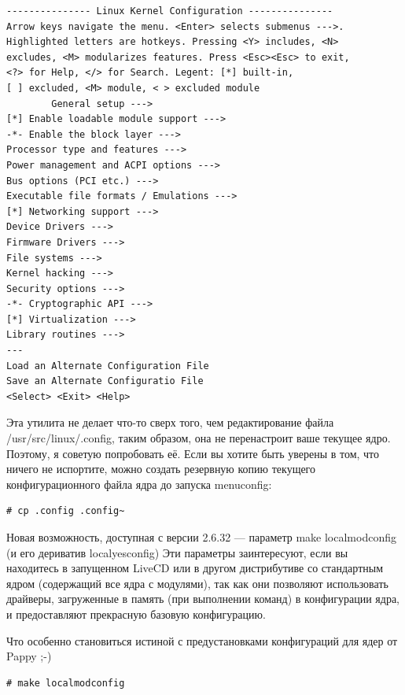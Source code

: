 \documentclass[10pt]{book}
\begin{document}
\vspace{3mm}
\begin{tcolorbox}[colback=gray!14!white, colframe=blue!75!blue]
\begin{lstlisting}
--------------- Linux Kernel Configuration ---------------
Arrow keys navigate the menu. <Enter> selects submenus --->.
Highlighted letters are hotkeys. Pressing <Y> includes, <N>
excludes, <M> modularizes features. Press <Esc><Esc> to exit,
<?> for Help, </> for Search. Legent: [*] built-in,
[ ] excluded, <M> module, < > excluded module
		General setup --->
[*] Enable loadable module support --->
-*- Enable the block layer --->
Processor type and features --->
Power management and ACPI options --->
Bus options (PCI etc.) --->
Executable file formats / Emulations --->
[*] Networking support --->
Device Drivers --->
Firmware Drivers --->
File systems --->
Kernel hacking --->
Security options --->
-*- Cryptographic API --->
[*] Virtualization --->
Library routines --->
---
Load an Alternate Configuration File
Save an Alternate Configuratio File
<Select> <Exit> <Help>
\end{lstlisting}
\end{tcolorbox}

Эта утилита не делает что-то сверх того, чем редактирование файла /usr/src/linux/.config, таким образом, она не перенастроит ваше текущее ядро. Поэтому, я советую попробовать её. Если вы хотите быть уверены в том, что ничего не испортите, можно создать резервную копию текущего конфигурационного файла ядра до запуска menuconfig: 

\vspace{3mm}
\begin{tcolorbox}
\begin{lstlisting}
# cp .config .config~
\end{lstlisting}
\end{tcolorbox}

Новая возможность, доступная с версии 2.6.32 — параметр make localmodconfig (и его дериватив localyesconfig) Эти параметры заинтересуют, если вы находитесь в запущенном LiveCD или в другом дистрибутиве со стандартным ядром (содержащий все ядра с модулями), так как они позволяют использовать драйверы, загруженные в память (при выполнении команд) в конфигурации ядра, и предоставляют прекрасную базовую конфигурацию. 

Что особенно становиться истиной с предустановками конфигураций для ядер от Pappy ;-)

\vspace{3mm}
\begin{tcolorbox}
\begin{lstlisting}
# make localmodconfig
\end{lstlisting}
\end{tcolorbox}
\end{document}
